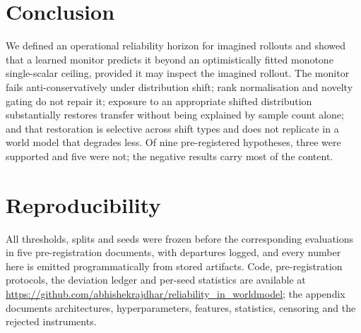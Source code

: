 \documentclass[twocolumn,10pt]{article}
\begin{document}
\section{Conclusion}
\label{sec:conclusion}

We defined an operational reliability horizon for imagined rollouts and showed that a learned
monitor predicts it beyond an optimistically fitted monotone single-scalar ceiling, provided it
may inspect the imagined rollout. The monitor fails anti-conservatively under distribution
shift; rank normalisation and novelty gating do not repair it; exposure to an appropriate
shifted distribution substantially restores transfer without being explained by sample count
alone; and that restoration is selective across shift types and does not replicate in a
world model that degrades less. Of nine pre-registered hypotheses, three were supported and
five were not; the negative results carry most of the content.

\section*{Reproducibility}

All thresholds, splits and seeds were frozen before the corresponding evaluations in five
pre-registration documents, with departures logged, and every number here is emitted
programmatically from stored artifacts. Code, pre-registration protocols, the deviation ledger
and per-seed statistics are available at \url{https://github.com/abhishekrajdhar/reliability_in_worldmodel}; the appendix documents architectures,
hyperparameters, features, statistics, censoring and the rejected instruments.



\end{document}
